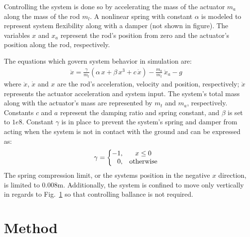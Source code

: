 \documentclass[letterpaper, 10 pt, conference]{ieeeconf}  %
\begin{document}
% 
Controlling the system is done so by accelerating the mass of the actuator $m_a$ along the mass of the rod $m_l$. A nonlinear spring with constant $\alpha$ is modeled to represent system flexibility along with a damper (not shown in figure). The variables $x$ and $x_a$ represent the rod's position from zero and the actuator's position along the rod, respectively.

The equations which govern system behavior in simulation are: 
% 
\begin{equation}
        \label{eq:EOM}
        \begin{aligned}
            \ddot{x} = \frac{\gamma}{m_t} \left(\alpha\,x + \beta\,x^3 + c\,\dot{x}\right)-\frac{m_a}{m_t}\,\ddot{x}_a-g
        \end{aligned}
\end{equation}
% 
where $\ddot{x}$, $\dot{x}$ and $x$ are the rod's acceleration, velocity and position, respectively; $\ddot{x}$ represents the actuator acceleration and system input. The system's total mass along with the actuator's mass are represented by $m_t$ and $m_a$, respectively. Constants $c$ and $a$ represent the damping ratio and spring constant, and $\beta$ is set to $1e8$. Constant $\gamma$ is in place to prevent the system's spring and damper from acting when the system is not in contact with the ground and can be expressed as:
% 
\begin{equation}
        \label{eq:EOMgama}
        \begin{aligned}
                \gamma =
                \left\{\begin{matrix}
                    -1, & x \leq 0\\ 
                    \hphantom{-} 0, & \textup{otherwise}
                \end{matrix}\right.
        \end{aligned}
\end{equation}
% 
The spring compression limit, or the systems position in the negative $x$ direction, is limited to 0.008m. Additionally, the system is confined to move only vertically in regards to Fig.~\ref{} so that controlling ballance is not required.

\section{Method}
\end{document}
